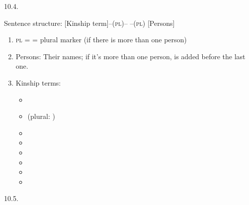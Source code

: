 \begin{refsection}
\begin{practiceproblemsolution}{10.4. \langnameKharia}

Sentence structure: [Kinship term]--(\textsc{pl})-- --(\textsc{pl}) [Persons]
\begin{enumerate}
        \item \textsc{pl} =  = plural marker (if there is more than one person)
        \item Persons: Their names; if it's more than one person,  is added before the last one.
        \item Kinship terms:

        \begin{multicols}{2}
            \begin{itemize}
                \item {}
                \item {} (plural: )
                \item {}
                \item {}
                \item {}
                \item {}
                \item {}
                \item {}
            \end{itemize}
        \end{multicols}
\end{enumerate}

\end{practiceproblemsolution}


\begin{practiceproblemsolution}{10.5. \langnameEmbaloh}


\end{practiceproblemsolution}
\end{refsection}
